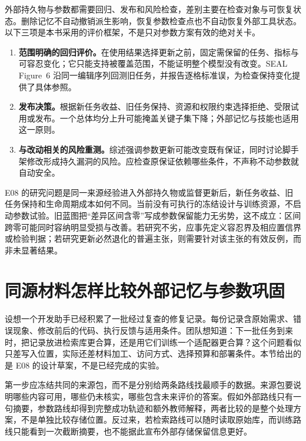 \begin{sloppypar}
外部持久物与参数都需要回归、发布和风险检查，差别主要在检查对象与可恢复状态。删除记忆不自动撤销派生影响，恢复参数检查点也不自动恢复外部工具状态。以下三项是本书采用的评价框架，不是只对参数方案有效的绝对关卡。
\end{sloppypar}

\begin{enumerate}
  \item \textbf{范围明确的回归评价。}在使用结果选择更新之前，固定需保留的任务、指标与可容忍变化；它只能支持被覆盖范围，不能证明整个模型没有改变。SEAL Figure~6 沿同一编辑序列回测旧任务，并报告逐格标准误，为检查保持变化提供了具体参照。
  \item \textbf{发布决策。}根据新任务收益、旧任务保持、资源和权限约束选择拒绝、受限试用或发布。一个总体均分上升可能掩盖关键子集下降；外部记忆与技能也适用这一原则。
  \item \textbf{与改动相关的风险重测。}综述强调参数更新可能改变既有保证，同时讨论脚手架修改形成持久漏洞的风险\cite{self-improvements-survey-2607}。应检查原保证依赖哪些条件，不声称不动参数就自动安全。
\end{enumerate}

\begin{sloppypar}
E08 的研究问题是同一来源经验进入外部持久物或监督更新后，新任务收益、旧任务保持和生命周期成本如何不同。当前没有可执行的冻结设计与训练资源，不启动参数试验。旧蓝图把“差异区间含零”写成参数保留能力无劣势，这不成立：区间跨零可能同时容纳明显受损与改善。若研究不劣，应事先定义容忍界及相应置信界或检验判据；若研究更新必然退化的普遍主张，则需要针对该主张的有效反例，而非未显著结果。
\end{sloppypar}

\section{同源材料怎样比较外部记忆与参数巩固}
\label{sec:ch10-samesource}

设想一个开发助手已经积累了一批经过复查的修复记录。每份记录含原始需求、错误现象、修改前后的代码、执行反馈与适用条件。团队想知道：下一批任务到来时，把记录放进检索库更合算，还是用它们训练一个适配器更合算？这个问题看似只差写入位置，实际还差材料加工、访问方式、选择预算和部署条件。本节给出的是 E08 的设计草案，不是已经完成的实验。

第一步应冻结共同的来源包，而不是分别给两条路线找最顺手的数据。来源包要说明哪些内容可用，哪些仍未核实，哪些包含未来评价的答案。假如外部路线只有一句摘要，参数路线却得到完整成功轨迹和额外教师解释，两者比较的是整个处理方案，不是单独比较存储位置。反过来，若检索路线可以随时读取原始库，而训练路线只能看到一次截断摘要，也不能据此宣布外部存储保留信息更好。

